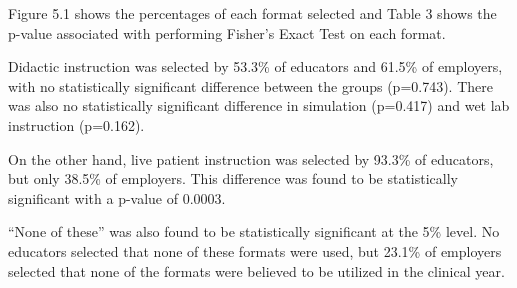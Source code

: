 \documentclass[
  11pt,
  letterpaper,
  DIV=11,
  numbers=noendperiod]{scrartcl}
\numberwithin{figure}{section}
\begin{document}
Figure 5.1 shows the percentages of each format selected and Table 3
shows the p-value associated with performing Fisher's Exact Test on each
format.

Didactic instruction was selected by 53.3\% of educators and 61.5\% of
employers, with no statistically significant difference between the
groups (p=0.743). There was also no statistically significant difference
in simulation (p=0.417) and wet lab instruction (p=0.162).

On the other hand, live patient instruction was selected by 93.3\% of
educators, but only 38.5\% of employers. This difference was found to be
statistically significant with a p-value of 0.0003.

``None of these'' was also found to be statistically significant at the
5\% level. No educators selected that none of these formats were used,
but 23.1\% of employers selected that none of the formats were believed
to be utilized in the clinical year.
\end{document}
